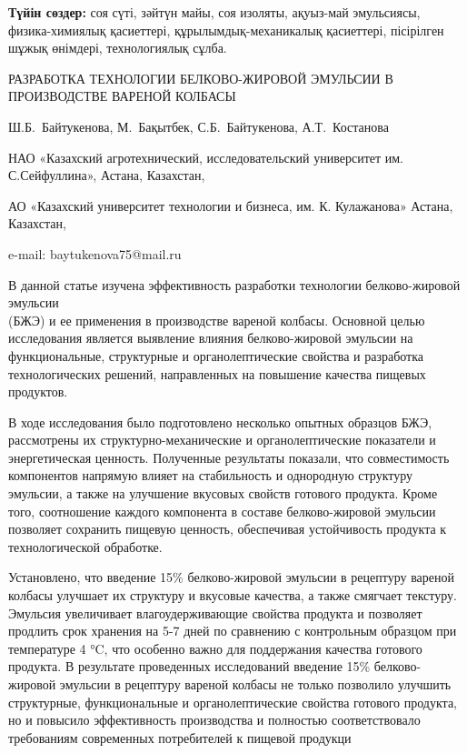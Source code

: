 {\bfseries Түйін сөздер:} соя сүті, зәйтүн майы, соя изоляты, ақуыз-май
эмульсиясы, физика-химиялық қасиеттері, құрылымдық-механикалық
қасиеттері, пісірілген шұжық өнімдері, технологиялық сұлба.

\begin{header}
РАЗРАБОТКА ТЕХНОЛОГИИ БЕЛКОВО-ЖИРОВОЙ ЭМУЛЬСИИ В ПРОИЗВОДСТВЕ ВАРЕНОЙ КОЛБАСЫ

Ш.Б.~Байтукенова\envelope,
М.~Бақытбек,
С.Б.~Байтукенова,
А.Т.~Костанова
\end{header}

\begin{affil}
НАО «Казахский агротехнический, исследовательский университет им. С.Сейфуллина», Астана, Казахстан,

АО «Казахский университет технологии и бизнеса, им. К. Кулажанова» Астана, Казахстан,

e-mail: baytukenova75@mail.ru
\end{affil}

В данной статье изучена эффективность разработки технологии
белково-жировой эмульсии \\(БЖЭ) и ее применения в производстве вареной
колбасы. Основной целью исследования является выявление влияния
белково-жировой эмульсии на функциональные, структурные и
органолептические свойства и разработка технологических решений,
направленных на повышение качества пищевых продуктов.

В ходе исследования было подготовлено несколько опытных образцов БЖЭ,
рассмотрены их структурно-механические и органолептические показатели и
энергетическая ценность. Полученные результаты показали, что
совместимость компонентов напрямую влияет на стабильность и однородную
структуру эмульсии, а также на улучшение вкусовых свойств готового
продукта. Кроме того, соотношение каждого компонента в составе
белково-жировой эмульсии позволяет сохранить пищевую ценность,
обеспечивая устойчивость продукта к технологической обработке.

Установлено, что введение 15\% белково-жировой эмульсии в рецептуру
вареной колбасы улучшает их структуру и вкусовые качества, а также
смягчает текстуру. Эмульсия увеличивает влагоудерживающие свойства
продукта и позволяет продлить срок хранения на 5-7 дней по сравнению с
контрольным образцом при температуре 4 °C, что особенно важно для
поддержания качества готового продукта. В результате проведенных
исследований введение 15\% белково-жировой эмульсии в рецептуру вареной
колбасы не только позволило улучшить структурные, функциональные и
органолептические свойства готового продукта, но и повысило
эффективность производства и полностью соответствовало требованиям
современных потребителей к пищевой продукци

